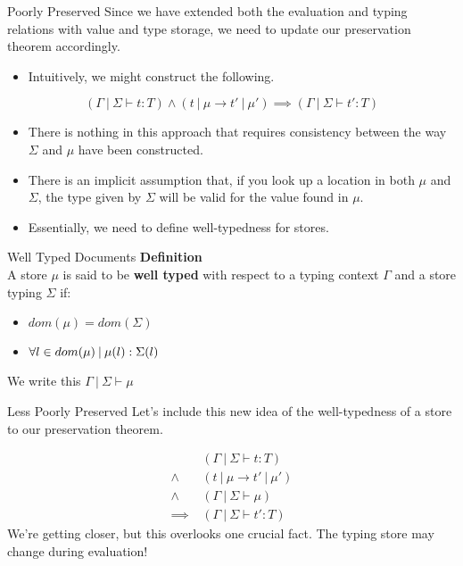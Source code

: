 \documentclass[11pt]{beamer}
\begin{document}
\begin{frame}[fragile=singleslide]{Poorly Preserved}
Since we have extended both the evaluation and typing relations with value and type storage, we need to update our preservation theorem accordingly.  
\begin{itemize}
\item Intuitively, we might construct the following.
\end{itemize}

\begin{equation}
(\Gamma \:|\:\Sigma \vdash t : T) \land (t\:|\:\mu \rightarrow t'\:|\:\mu') \implies (\Gamma\:|\:\Sigma \vdash t' : T) \tag{Wrong!}
\end{equation}
\begin{itemize}
\item There is nothing in this approach that requires consistency between the way $\Sigma$ and $\mu$ have been constructed.
\item There is an implicit assumption that, if you look up a location in both $\mu$ and $\Sigma$, the type given by $\Sigma$ will be valid for the value found in $\mu$.
\item Essentially, we need to define well-typedness for stores.  
\end{itemize}
\end{frame}


\begin{frame}[fragile=singleslide]{Well Typed Documents}
\textbf{Definition} \\
A store $\mu$ is said to be \textbf{well typed} with respect to a typing context $\Gamma$ and a store typing $\Sigma$ if:
\begin{itemize}
\item $dom(\mu) = dom(\Sigma)$
\item $\forall \mathnormal{l} \in dom(\mu)\:|\:\mu(\mathnormal{l}) : \Sigma(\mathnormal{l})$
\end{itemize}
We write this $\Gamma \:|\:\Sigma \vdash \mu$
\end{frame}

\begin{frame}[fragile=singleslide]{Less Poorly Preserved}
Let's include this new idea of the well-typedness of a store to our preservation theorem.

\begin{align*}
& \:(\Gamma \:|\:\Sigma \vdash t : T) \\
\land & \:(t\:|\:\mu \rightarrow t'\:|\:\mu') \\
\land & \:(\Gamma \:|\:\Sigma \vdash \mu) \\
\implies & \:(\Gamma\:|\:\Sigma \vdash t' : T) 
\end{align*}
We're getting closer, but this overlooks one crucial fact.  The typing store may change during evaluation! 
\end{frame}
\end{document}

